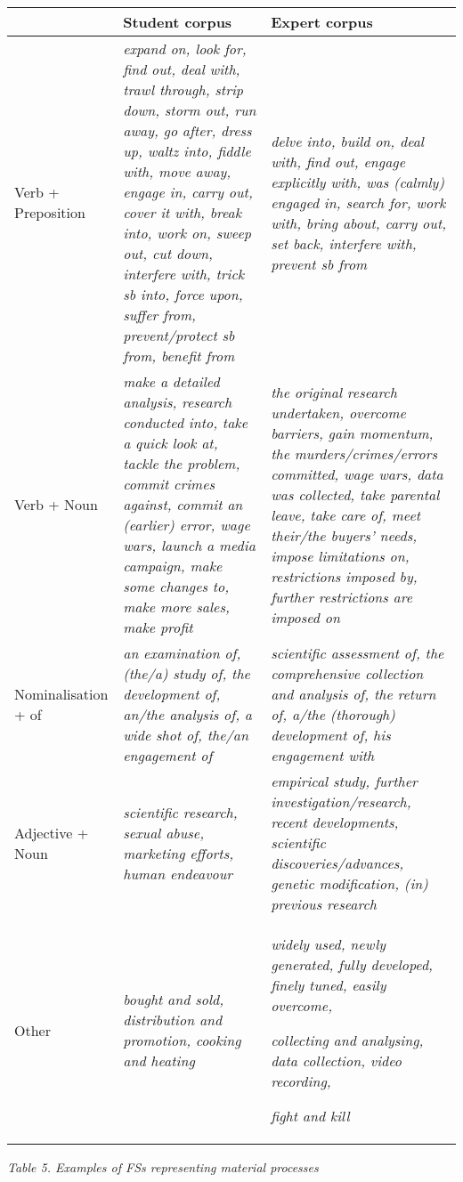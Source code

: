 \documentclass[12pt]{article}
\newenvironment{styleStandard}{\setlength\leftskip{0cm}\setlength\rightskip{0cm plus 1fil}\setlength\parindent{0cm}\setlength\parfillskip{0pt plus 1fil}\setlength\parskip{0cm plus 1pt}\writerlistparindent\writerlistleftskip\leavevmode\normalfont\normalsize\writerlistlabel\ignorespaces}{\unskip\vspace{0cm plus 1pt}\par}
\newcommand\writerlistleftskip{}
\newcommand\writerlistparindent{}
\newcommand\writerlistlabel{}
\begin{document}
\begin{center}
\tablefirsthead{}
\tablehead{}
\tabletail{}
\tablelasttail{}
\begin{supertabular}{m{1.1587598in}m{1.7205598in}m{1.6045599in}}
\hline
 &
Student corpus &
Expert corpus\\\hline
Verb + Preposition &
\textit{expand on, look for, find out, deal with, trawl through, strip down, storm out, run away, go after, dress up, waltz into, fiddle with, move away, engage in, carry out, cover it with, break into, work on, sweep out, cut down, interfere with, trick sb into, force upon, suffer from, prevent/protect sb from, benefit from} &
\textit{delve into, build on, deal with, find out, engage explicitly with, was (calmly) engaged in, search for, work with, bring about, carry out, set back, interfere with, prevent sb from}\\\hline
Verb + Noun &
\textit{make a detailed analysis, research conducted into, take a quick look at, tackle the problem, commit crimes against, commit an (earlier) error, wage wars, launch a media campaign, make some changes to, make more sales, make profit} &
\textit{the original research undertaken, overcome barriers, gain momentum, the murders/crimes/errors committed, wage wars, data was collected, take parental leave, take care of, meet their/the buyers’ needs, impose limitations on, restrictions imposed by, further restrictions are imposed on}\\\hline
Nominalisation + of &
\textit{an examination of, (the/a) study of, the development of, an/the analysis of, a wide shot of, the/an engagement of} &
\textit{scientific assessment of, the comprehensive collection and analysis of, the return of, a/the (thorough) development of, his engagement with}\\\hline
Adjective + Noun &
\textit{scientific research, sexual abuse, marketing efforts, human endeavour} &
\textit{empirical study, further investigation/research, recent developments, scientific discoveries/advances, genetic modification, (in) previous research}\\\hline
Other &
\textit{bought and sold, distribution and promotion, cooking and heating} &
\textit{widely used, newly generated, fully developed, finely tuned, easily overcome,}

\textit{collecting and analysing, data collection, video recording, }

\textit{fight and kill}\\\hline
\end{supertabular}
\end{center}
\begin{styleStandard}
\textit{Table 5. Examples of FSs representing material processes}
\end{styleStandard}
\end{document}
